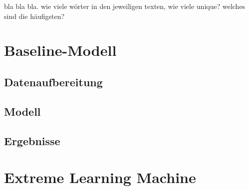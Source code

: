 bla bla bla. wie viele wörter in den jeweiligen texten, wie viele unique? welches sind die häufigsten?
\section{Baseline-Modell}
\subsection{Datenaufbereitung}
\subsection{Modell}
\subsection{Ergebnisse}
\section{Extreme Learning Machine}
